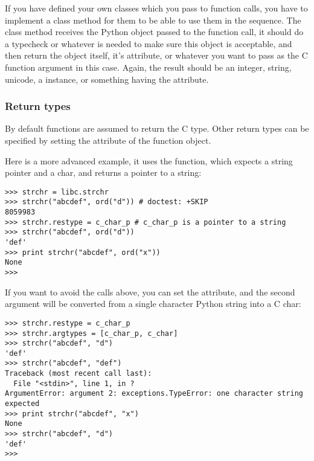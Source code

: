 If you have defined your own classes which you pass to function calls,
you have to implement a  class method for them to be
able to use them in the  sequence. The 
class method receives the Python object passed to the function call,
it should do a typecheck or whatever is needed to make sure this
object is acceptable, and then return the object itself, it's
 attribute, or whatever you want to pass as the C
function argument in this case. Again, the result should be an
integer, string, unicode, a  instance, or something having
the  attribute.


\subsubsection{Return types\label{ctypes-return-types}}

By default functions are assumed to return the C  type.  Other
return types can be specified by setting the  attribute of
the function object.

Here is a more advanced example, it uses the  function, which
expects a string pointer and a char, and returns a pointer to a
string:
\begin{verbatim}
>>> strchr = libc.strchr
>>> strchr("abcdef", ord("d")) # doctest: +SKIP
8059983
>>> strchr.restype = c_char_p # c_char_p is a pointer to a string
>>> strchr("abcdef", ord("d"))
'def'
>>> print strchr("abcdef", ord("x"))
None
>>>
\end{verbatim}

If you want to avoid the  calls above, you can set the
 attribute, and the second argument will be converted from
a single character Python string into a C char:
\begin{verbatim}
>>> strchr.restype = c_char_p
>>> strchr.argtypes = [c_char_p, c_char]
>>> strchr("abcdef", "d")
'def'
>>> strchr("abcdef", "def")
Traceback (most recent call last):
  File "<stdin>", line 1, in ?
ArgumentError: argument 2: exceptions.TypeError: one character string expected
>>> print strchr("abcdef", "x")
None
>>> strchr("abcdef", "d")
'def'
>>>
\end{verbatim}

